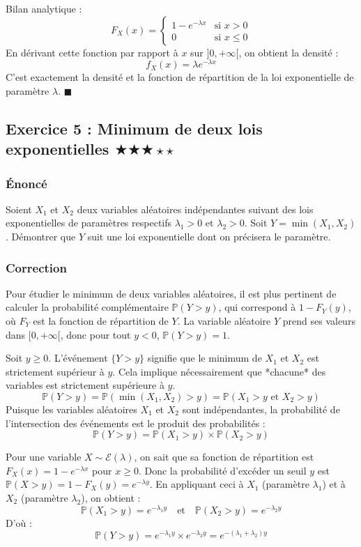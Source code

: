 \documentclass[11pt,a4paper]{article}
\begin{document}
Bilan analytique :
$$ F_X(x) = \begin{cases} 1 - e^{-\lambda x} & \text{si } x > 0 \\ 0 & \text{si } x \leq 0 \end{cases} $$
En dérivant cette fonction par rapport à $x$ sur $]0, +\infty[$, on obtient la densité :
$$ f_X(x) = \lambda e^{-\lambda x} $$
C'est exactement la densité et la fonction de répartition de la loi exponentielle de paramètre $\lambda$. $\blacksquare$


\subsection*{Exercice 5 : Minimum de deux lois exponentielles \quad $\bigstar\bigstar\bigstar\star\star$}

\subsubsection*{Énoncé}

Soient $X_1$ et $X_2$ deux variables aléatoires indépendantes suivant des lois exponentielles de paramètres respectifs $\lambda_1 > 0$ et $\lambda_2 > 0$.
Soit $Y = \min(X_1, X_2)$.
Démontrer que $Y$ suit une loi exponentielle dont on précisera le paramètre.

\subsubsection*{Correction}

Pour étudier le minimum de deux variables aléatoires, il est plus pertinent de calculer la probabilité complémentaire $\mathbb{P}(Y > y)$, qui correspond à $1 - F_Y(y)$, où $F_Y$ est la fonction de répartition de $Y$.
La variable aléatoire $Y$ prend ses valeurs dans $[0, +\infty[$, donc pour tout $y < 0$, $\mathbb{P}(Y > y) = 1$.

Soit $y \geq 0$. L'événement $\{Y > y\}$ signifie que le minimum de $X_1$ et $X_2$ est strictement supérieur à $y$. Cela implique nécessairement que *chacune* des variables est strictement supérieure à $y$.
$$ \mathbb{P}(Y > y) = \mathbb{P}(\min(X_1, X_2) > y) = \mathbb{P}(X_1 > y \text{ et } X_2 > y) $$
Puisque les variables aléatoires $X_1$ et $X_2$ sont indépendantes, la probabilité de l'intersection des événements est le produit des probabilités :
$$ \mathbb{P}(Y > y) = \mathbb{P}(X_1 > y) \times \mathbb{P}(X_2 > y) $$

Pour une variable $X \sim \mathcal{E}(\lambda)$, on sait que sa fonction de répartition est $F_X(x) = 1 - e^{-\lambda x}$ pour $x \geq 0$. Donc la probabilité d'excéder un seuil $y$ est $\mathbb{P}(X > y) = 1 - F_X(y) = e^{-\lambda y}$.
En appliquant ceci à $X_1$ (paramètre $\lambda_1$) et à $X_2$ (paramètre $\lambda_2$), on obtient :
$$ \mathbb{P}(X_1 > y) = e^{-\lambda_1 y} \quad \text{et} \quad \mathbb{P}(X_2 > y) = e^{-\lambda_2 y} $$
D'où :
$$ \mathbb{P}(Y > y) = e^{-\lambda_1 y} \times e^{-\lambda_2 y} = e^{-(\lambda_1 + \lambda_2)y} $$
\end{document}

